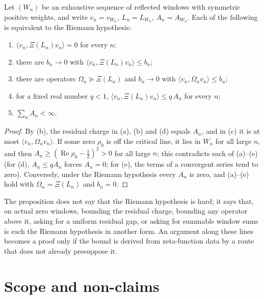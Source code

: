 \documentclass[11pt]{article}
\DeclareMathOperator{\Real}{Re}
\theoremstyle{definition}
\begin{document}
\begin{proposition}
\label{prop:rh:window-equivalences}
Let \((W_n)\) be an exhaustive sequence of reflected windows with
symmetric positive weights, and write \(v_n=v_{W_n}\), \(L_n=L_{W_n}\),
\(A_n=A_{W_n}\).  Each of the following is equivalent to the Riemann
hypothesis:
\begin{enumerate}[label=\textup{(\alph*)}]
  \item \(\langle v_n,\Xi(L_n)v_n\rangle=0\) for every \(n\);
  \item there are \(b_n\to0\) with \(\langle v_n,\Xi(L_n)v_n\rangle\leq b_n\);
  \item there are operators \(\Omega_n\succeq\Xi(L_n)\) and \(b_n\to0\)
    with \(\langle v_n,\Omega_nv_n\rangle\leq b_n\);
  \item for a fixed real number \(q<1\),
    \(\langle v_n,\Xi(L_n)v_n\rangle\leq q\,A_n\) for every \(n\);
  \item \(\sum_n A_n<\infty\).
\end{enumerate}
\end{proposition}

\begin{proof}
By (b), the residual charge in (a),
(b) and (d) equals \(A_n\), and in (c) it is at most
\(\langle v_n,\Omega_nv_n\rangle\).  If some zero \(\rho_0\) is off the
critical line, it lies in \(W_n\) for all large \(n\), and then
\(A_n\geq(\Real\rho_0-\frac12)^2>0\) for all large \(n\); this
contradicts each of (a)--(e) (for (d), \(A_n\leq qA_n\) forces
\(A_n=0\); for (e), the terms of a convergent series tend to zero).
Conversely, under the Riemann hypothesis every \(A_n\) is zero, and
(a)--(e) hold with \(\Omega_n=\Xi(L_n)\) and \(b_n=0\).
\end{proof}

The proposition does not say that the Riemann hypothesis is hard; it
says that, on actual zero windows, bounding the residual charge,
bounding any operator above it, asking for a uniform residual gap, or
asking for summable window sums is each the Riemann hypothesis in
another form.  An argument along these lines becomes a proof only if
the bound is derived from zeta-function data by a route that does not
already presuppose it.
 \section{Scope and non-claims}
\label{sec:scope_and_nonclaims}
\end{document}
